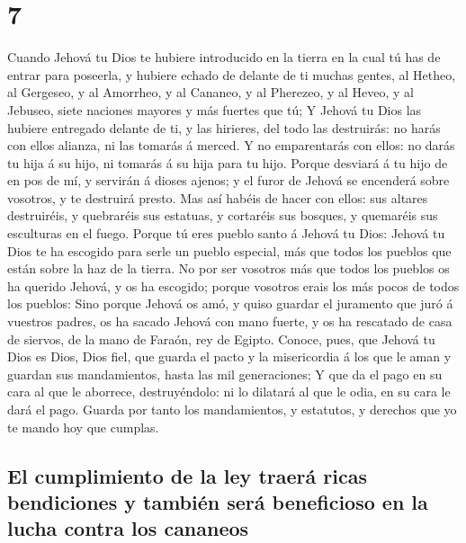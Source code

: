\hypertarget{section-05-7}{%
\section{7}\label{section-05-7}}

 Cuando Jehová tu Dios te hubiere introducido en la tierra
en la cual tú has de entrar para poseerla, y hubiere echado de delante
de ti muchas gentes, al Hetheo, al Gergeseo, y al Amorrheo, y al
Cananeo, y al Pherezeo, y al Heveo, y al Jebuseo, siete naciones mayores
y más fuertes que tú;  Y Jehová tu Dios las hubiere
entregado delante de ti, y las hirieres, del todo las destruirás: no
harás con ellos alianza, ni las tomarás á merced.  Y no
emparentarás con ellos: no darás tu hija á su hijo, ni tomarás á su hija
para tu hijo.  Porque desviará á tu hijo de en pos de mí,
y servirán á dioses ajenos; y el furor de Jehová se encenderá sobre
vosotros, y te destruirá presto.  Mas así habéis de hacer
con ellos: sus altares destruiréis, y quebraréis sus estatuas, y
cortaréis sus bosques, y quemaréis sus esculturas en el fuego.
 Porque tú eres pueblo santo á Jehová tu Dios: Jehová tu
Dios te ha escogido para serle un pueblo especial, más que todos los
pueblos que están sobre la haz de la tierra.  No por ser
vosotros más que todos los pueblos os ha querido Jehová, y os ha
escogido; porque vosotros erais los más pocos de todos los pueblos:
 Sino porque Jehová os amó, y quiso guardar el juramento
que juró á vuestros padres, os ha sacado Jehová con mano fuerte, y os ha
rescatado de casa de siervos, de la mano de Faraón, rey de Egipto.
 Conoce, pues, que Jehová tu Dios es Dios, Dios fiel, que
guarda el pacto y la misericordia á los que le aman y guardan sus
mandamientos, hasta las mil generaciones;  Y que da el
pago en su cara al que le aborrece, destruyéndolo: ni lo dilatará al que
le odia, en su cara le dará el pago.  Guarda por tanto
los mandamientos, y estatutos, y derechos que yo te mando hoy que
cumplas.

\hypertarget{el-cumplimiento-de-la-ley-traeruxe1-ricas-bendiciones-y-tambiuxe9n-seruxe1-beneficioso-en-la-lucha-contra-los-cananeos}{%
\subsection{El cumplimiento de la ley traerá ricas bendiciones y también
será beneficioso en la lucha contra los
cananeos}\label{el-cumplimiento-de-la-ley-traeruxe1-ricas-bendiciones-y-tambiuxe9n-seruxe1-beneficioso-en-la-lucha-contra-los-cananeos}}

